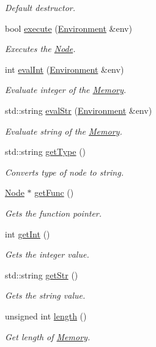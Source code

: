 \begin{DoxyCompactItemize}
\begin{DoxyCompactList}\small\item\em Default destructor. \end{DoxyCompactList}\item 
bool \hyperlink{classMemory_ae00c898b45732c0bf74140d604363319}{execute} (\hyperlink{classEnvironment}{Environment} \&env)
\begin{DoxyCompactList}\small\item\em Executes the \hyperlink{classNode}{Node}. \end{DoxyCompactList}\item 
int \hyperlink{classMemory_a0bf9b7657489146568ae62137c684522}{eval\+Int} (\hyperlink{classEnvironment}{Environment} \&env)
\begin{DoxyCompactList}\small\item\em Evaluate integer of the \hyperlink{classMemory}{Memory}. \end{DoxyCompactList}\item 
std\+::string \hyperlink{classMemory_a298bdf094ac4807ad563f76f5bf159d0}{eval\+Str} (\hyperlink{classEnvironment}{Environment} \&env)
\begin{DoxyCompactList}\small\item\em Evaluate string of the \hyperlink{classMemory}{Memory}. \end{DoxyCompactList}\item 
std\+::string \hyperlink{classMemory_a222e2dc37b587f8c243aabc1eebcf7a1}{get\+Type} ()
\begin{DoxyCompactList}\small\item\em Converts type of node to string. \end{DoxyCompactList}\item 
\hyperlink{classNode}{Node} $\ast$ \hyperlink{classMemory_a45c7902075f19101c539240893075311}{get\+Func} ()
\begin{DoxyCompactList}\small\item\em Gets the function pointer. \end{DoxyCompactList}\item 
int \hyperlink{classMemory_a4e22f8404e11645dcaa68b2ffc4c4455}{get\+Int} ()
\begin{DoxyCompactList}\small\item\em Gets the integer value. \end{DoxyCompactList}\item 
std\+::string \hyperlink{classMemory_aecf23bb53fc58d668edae8e4e791ea99}{get\+Str} ()
\begin{DoxyCompactList}\small\item\em Gets the string value. \end{DoxyCompactList}\item 
unsigned int \hyperlink{classMemory_a55d46c565490996d8680cdb78cca6a76}{length} ()
\begin{DoxyCompactList}\small\item\em Get length of \hyperlink{classMemory}{Memory}. \end{DoxyCompactList}\end{DoxyCompactItemize}
